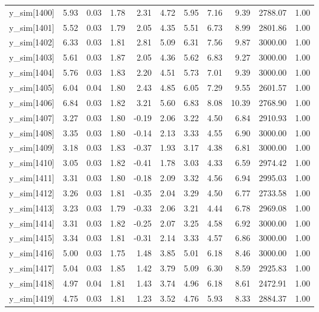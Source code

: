 \begin{table}[ht]
\begin{tabular}{rrrrrrrrrrr}
  y\_sim[1400] & 5.93 & 0.03 & 1.78 & 2.31 & 4.72 & 5.95 & 7.16 & 9.39 & 2788.07 & 1.00 \\ 
  y\_sim[1401] & 5.52 & 0.03 & 1.79 & 2.05 & 4.35 & 5.51 & 6.73 & 8.99 & 2801.86 & 1.00 \\ 
  y\_sim[1402] & 6.33 & 0.03 & 1.81 & 2.81 & 5.09 & 6.31 & 7.56 & 9.87 & 3000.00 & 1.00 \\ 
  y\_sim[1403] & 5.61 & 0.03 & 1.87 & 2.05 & 4.36 & 5.62 & 6.83 & 9.27 & 3000.00 & 1.00 \\ 
  y\_sim[1404] & 5.76 & 0.03 & 1.83 & 2.20 & 4.51 & 5.73 & 7.01 & 9.39 & 3000.00 & 1.00 \\ 
  y\_sim[1405] & 6.04 & 0.04 & 1.80 & 2.43 & 4.85 & 6.05 & 7.29 & 9.55 & 2601.57 & 1.00 \\ 
  y\_sim[1406] & 6.84 & 0.03 & 1.82 & 3.21 & 5.60 & 6.83 & 8.08 & 10.39 & 2768.90 & 1.00 \\ 
  y\_sim[1407] & 3.27 & 0.03 & 1.80 & -0.19 & 2.06 & 3.22 & 4.50 & 6.84 & 2910.93 & 1.00 \\ 
  y\_sim[1408] & 3.35 & 0.03 & 1.80 & -0.14 & 2.13 & 3.33 & 4.55 & 6.90 & 3000.00 & 1.00 \\ 
  y\_sim[1409] & 3.18 & 0.03 & 1.83 & -0.37 & 1.93 & 3.17 & 4.38 & 6.81 & 3000.00 & 1.00 \\ 
  y\_sim[1410] & 3.05 & 0.03 & 1.82 & -0.41 & 1.78 & 3.03 & 4.33 & 6.59 & 2974.42 & 1.00 \\ 
  y\_sim[1411] & 3.31 & 0.03 & 1.80 & -0.18 & 2.09 & 3.32 & 4.56 & 6.94 & 2995.03 & 1.00 \\ 
  y\_sim[1412] & 3.26 & 0.03 & 1.81 & -0.35 & 2.04 & 3.29 & 4.50 & 6.77 & 2733.58 & 1.00 \\ 
  y\_sim[1413] & 3.23 & 0.03 & 1.79 & -0.33 & 2.06 & 3.21 & 4.44 & 6.78 & 2969.08 & 1.00 \\ 
  y\_sim[1414] & 3.31 & 0.03 & 1.82 & -0.25 & 2.07 & 3.25 & 4.58 & 6.92 & 3000.00 & 1.00 \\ 
  y\_sim[1415] & 3.34 & 0.03 & 1.81 & -0.31 & 2.14 & 3.33 & 4.57 & 6.86 & 3000.00 & 1.00 \\ 
  y\_sim[1416] & 5.00 & 0.03 & 1.75 & 1.48 & 3.85 & 5.01 & 6.18 & 8.46 & 3000.00 & 1.00 \\ 
  y\_sim[1417] & 5.04 & 0.03 & 1.85 & 1.42 & 3.79 & 5.09 & 6.30 & 8.59 & 2925.83 & 1.00 \\ 
  y\_sim[1418] & 4.97 & 0.04 & 1.81 & 1.43 & 3.74 & 4.96 & 6.18 & 8.61 & 2472.91 & 1.00 \\ 
  y\_sim[1419] & 4.75 & 0.03 & 1.81 & 1.23 & 3.52 & 4.76 & 5.93 & 8.33 & 2884.37 & 1.00 \\ 

\end{tabular}
\end{table}
